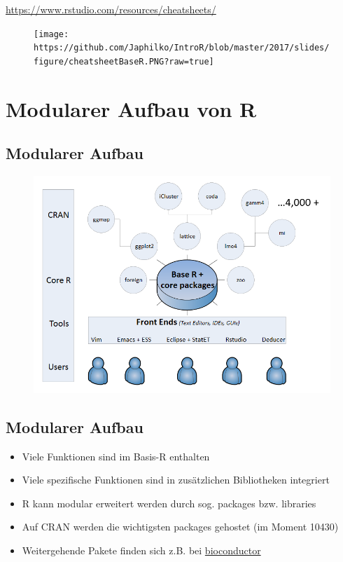 \documentclass[]{article}
\providecommand{\tightlist}{%
  \setlength{\itemsep}{0pt}\setlength{\parskip}{0pt}}
\begin{document}
\url{https://www.rstudio.com/resources/cheatsheets/}

\begin{figure}[htbp]
\centering
\texttt{[image: https://github.com/Japhilko/IntroR/blob/master/2017/slides/figure/cheatsheetBaseR.PNG?raw=true]}
\caption{}
\end{figure}

\section{Modularer Aufbau von R}\label{modularer-aufbau-von-r}

\subsection{Modularer Aufbau}\label{modularer-aufbau}

\begin{figure}[htbp]
\centering
\includegraphics{figure/Packages.PNG}
\caption{}
\end{figure}

\subsection{Modularer Aufbau}\label{modularer-aufbau-1}

\begin{itemize}
\tightlist
\item
  Viele Funktionen sind im Basis-R enthalten
\item
  Viele spezifische Funktionen sind in zusätzlichen Bibliotheken
  integriert
\item
  R kann modular erweitert werden durch sog. packages bzw. libraries
\item
  Auf CRAN werden die wichtigsten packages gehostet (im Moment 10430)
\item
  Weitergehende Pakete finden sich z.B. bei
  \href{www.bioconductor.org}{bioconductor}
\end{itemize}
\end{document}
